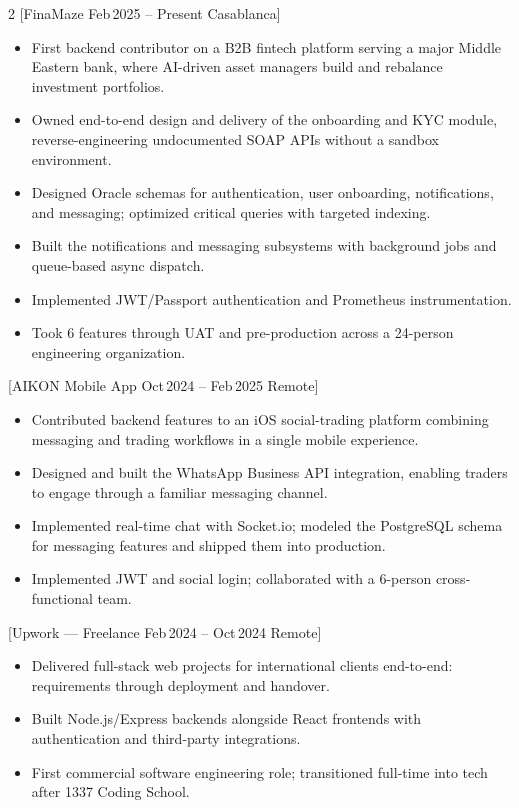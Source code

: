 \documentclass[10pt,a4paper,twoside,openany,nodeprecatedcode]{dndbook}
\begin{document}
\begin{multicols}{2}
[FinaMaze \textbar{} Feb\,2025 -- Present \textbar{} Casablanca]
\begin{itemize}
  \item First backend contributor on a B2B fintech platform serving a major Middle Eastern bank,
        where AI-driven asset managers build and rebalance investment portfolios.
  \item Owned end-to-end design and delivery of the onboarding and KYC module, reverse-engineering
        undocumented SOAP APIs without a sandbox environment.
  \item Designed Oracle schemas for authentication, user onboarding, notifications, and messaging;
        optimized critical queries with targeted indexing.
  \item Built the notifications and messaging subsystems with background jobs and queue-based async
        dispatch.
  \item Implemented JWT/Passport authentication and Prometheus instrumentation.
  \item Took 6 features through UAT and pre-production across a 24-person engineering organization.
\end{itemize}

[AIKON Mobile App \textbar{} Oct\,2024 -- Feb\,2025 \textbar{} Remote]
\begin{itemize}
  \item Contributed backend features to an iOS social-trading platform combining messaging and
        trading workflows in a single mobile experience.
  \item Designed and built the WhatsApp Business API integration, enabling traders to engage
        through a familiar messaging channel.
  \item Implemented real-time chat with Socket.io; modeled the PostgreSQL schema for messaging
        features and shipped them into production.
  \item Implemented JWT and social login; collaborated with a 6-person cross-functional team.
\end{itemize}

[Upwork --- Freelance \textbar{} Feb\,2024 -- Oct\,2024 \textbar{} Remote]
\begin{itemize}
  \item Delivered full-stack web projects for international clients end-to-end: requirements
        through deployment and handover.
  \item Built Node.js/Express backends alongside React frontends with authentication and
        third-party integrations.
  \item First commercial software engineering role; transitioned full-time into tech after
        1337 Coding School.
\end{itemize}


\end{multicols}
\end{document}
